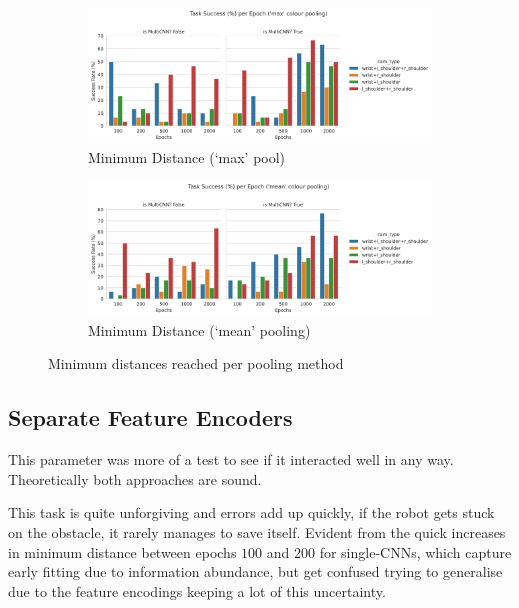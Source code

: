 \begin{figure}[htpb]
  \centering
  \begin{subfigure}{0.45\linewidth}
    \centering
    \includegraphics[width=0.9\linewidth]{assets/evaluation/cam-attn/ro_random-cam_attn-max-success.png}
    \caption{Minimum Distance (`max' pool)}\label{subfig:cam-attn-max-success-cnn}
  \end{subfigure}
  \hfill
  \begin{subfigure}{0.45\linewidth}
    \centering
    \includegraphics[width=0.9\linewidth]{assets/evaluation/cam-attn/ro_random-cam_attn-mean-success.png}
    \caption{Minimum Distance (`mean' pooling)}\label{subfig:cam-attn-mean-success-cnn}
  \end{subfigure}
  \caption{Minimum distances reached per pooling method}\label{fig:cam-attn-success-cnn}
\end{figure}

\subsection{Separate Feature Encoders}
This parameter was more of a test to see if it interacted well in any way. Theoretically both approaches are sound. 

This task is quite unforgiving and errors add up quickly, if the robot gets stuck on the obstacle, it rarely manages to save itself. Evident from the quick increases in minimum distance between epochs $100$ and $200$ for single-CNNs, which capture early fitting due to information abundance, but get confused trying to generalise due to the feature encodings keeping a lot of this uncertainty.

